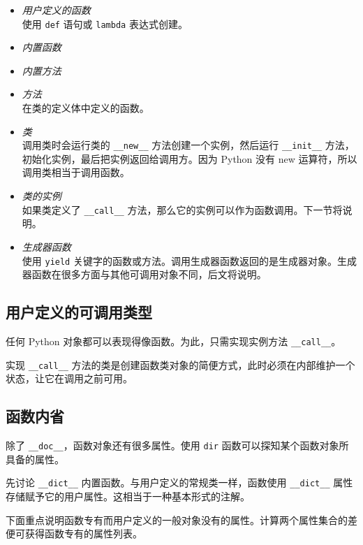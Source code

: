\begin{itemize}
    \item \textit{用户定义的函数} \\
    使用 \texttt{def} 语句或 \texttt{lambda} 表达式创建。
    \item \textit{内置函数} 
    \item \textit{内置方法} 
    \item \textit{方法} \\
    在类的定义体中定义的函数。
    \item \textit{类} \\
    调用类时会运行类的 \texttt{\_\_new\_\_} 方法创建一个实例，然后运行 \texttt{\_\_init\_\_} 方法，初始化实例，最后把实例返回给调用方。因为 Python 没有 new 运算符，所以调用类相当于调用函数。
    \item \textit{类的实例} \\
    如果类定义了 \texttt{\_\_call\_\_} 方法，那么它的实例可以作为函数调用。下一节将说明。
    \item \textit{生成器函数} \\
    使用 \texttt{yield} 关键字的函数或方法。调用生成器函数返回的是生成器对象。生成器函数在很多方面与其他可调用对象不同，后文将说明。
\end{itemize}

\subsection{用户定义的可调用类型}

任何 Python 对象都可以表现得像函数。为此，只需实现实例方法 \texttt{\_\_call\_\_}。



实现 \texttt{\_\_call\_\_} 方法的类是创建函数类对象的简便方式，此时必须在内部维护一个状态，让它在调用之前可用。

\subsection{函数内省}

除了 \texttt{\_\_doc\_\_}，函数对象还有很多属性。使用 \texttt{dir} 函数可以探知某个函数对象所具备的属性。

先讨论 \texttt{\_\_dict\_\_} 内置函数。与用户定义的常规类一样，函数使用 \texttt{\_\_dict\_\_} 属性存储赋予它的用户属性。这相当于一种基本形式的注解。

下面重点说明函数专有而用户定义的一般对象没有的属性。计算两个属性集合的差便可获得函数专有的属性列表。

